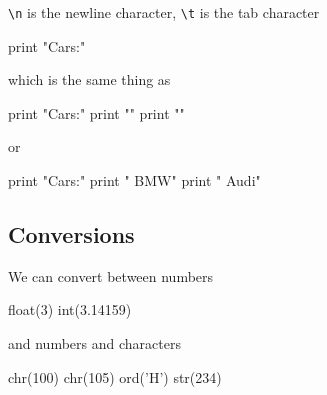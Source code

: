 \begin{fullwidth}
{\tt \textbackslash n}  is the newline character, {\tt \textbackslash t}  is the tab character


\begin{pyconsole}[f]
print "Cars:\n\tBMW\n\tAudi"
\end{pyconsole}

which is the same thing as
 
\begin{pyconsole}[g]
print "Cars:"
print "\tBMW"
print "\tAudi"
\end{pyconsole}

or

\begin{pyconsole}[h]
print "Cars:"
print "	BMW"
print "	Audi"
\end{pyconsole}


\subsection{Conversions}

We can convert between numbers

\begin{pyconsole}[i]
float(3)
int(3.14159)
\end{pyconsole}

and numbers and characters

\begin{pyconsole}[j]
chr(100)
chr(105)
ord('H')
str(234)
\end{pyconsole}

\end{fullwidth}